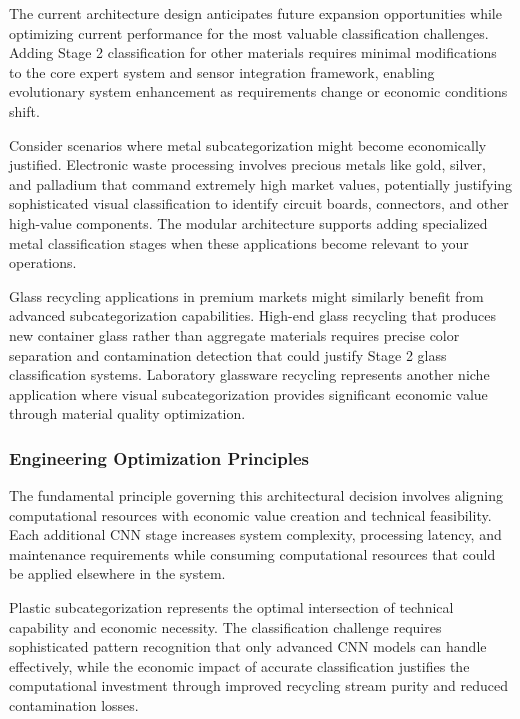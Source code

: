 \documentclass[11pt, a4paper]{article}
\begin{document}
The current architecture design anticipates future expansion opportunities while optimizing current performance for the most valuable classification challenges. Adding Stage 2 classification for other materials requires minimal modifications to the core expert system and sensor integration framework, enabling evolutionary system enhancement as requirements change or economic conditions shift.

Consider scenarios where metal subcategorization might become economically justified. Electronic waste processing involves precious metals like gold, silver, and palladium that command extremely high market values, potentially justifying sophisticated visual classification to identify circuit boards, connectors, and other high-value components. The modular architecture supports adding specialized metal classification stages when these applications become relevant to your operations.

Glass recycling applications in premium markets might similarly benefit from advanced subcategorization capabilities. High-end glass recycling that produces new container glass rather than aggregate materials requires precise color separation and contamination detection that could justify Stage 2 glass classification systems. Laboratory glassware recycling represents another niche application where visual subcategorization provides significant economic value through material quality optimization.

\subsubsection{Engineering Optimization Principles}

The fundamental principle governing this architectural decision involves aligning computational resources with economic value creation and technical feasibility. Each additional CNN stage increases system complexity, processing latency, and maintenance requirements while consuming computational resources that could be applied elsewhere in the system.

Plastic subcategorization represents the optimal intersection of technical capability and economic necessity. The classification challenge requires sophisticated pattern recognition that only advanced CNN models can handle effectively, while the economic impact of accurate classification justifies the computational investment through improved recycling stream purity and reduced contamination losses.
\end{document}
